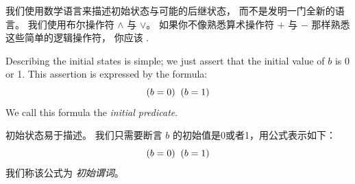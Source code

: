 \begin{ch}
  我们使用数学语言来描述初始状态与可能的后继状态，
  而不是发明一门全新的语言。
  我们使用布尔操作符 $\land$ 与 $\lor$。
  如果你不像熟悉算术操作符 $+$ 与 $-$ 那样熟悉这些简单的逻辑操作符，
  你应该%
  \textsf{}.
\end{ch}

\begin{en}
Describing the initial states is simple; we just assert that the 
initial value of $b$ is 0 or 1.  This assertion is expressed by
the formula:
 \[ (b=0) \; \/ \; (b=1)\]
We call this formula the 
\emph{initial predicate}.
\end{en}

\begin{ch}
  初始状态易于描述。
  我们只需要断言 $b$ 的初始值是0或者1，用公式表示如下：
  \[ (b=0) \; \/ \; (b=1)\]
  我们称该公式为%
  \emph{初始谓词}。
\end{ch}

